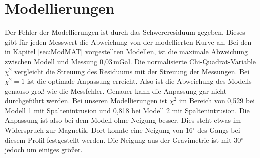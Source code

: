 \section{Modellierungen}

Der Fehler der Modellierungen ist durch das Schwereresiduum gegeben. Dieses gibt für jeden Messwert die Abweichung von der modellierten Kurve an. Bei den in Kapitel \ref{sec:ModMAT} vorgestellten Modellen, ist die maximale Abweichung zwischen Modell und Messung 0,03\,mGal. Die normalisierte Chi-Quadrat-Variable $\chi^2$ vergleicht die Streuung des Residuums mit der Streuung der Messungen. Bei $\chi^2=1$ ist die optimale Anpassung erreicht. Also ist die Abweichung des Modells genauso groß wie die Messfehler. Genauer kann die Anpassung gar nicht durchgeführt werden. Bei unseren Modellierungen ist $\chi^2$ im Bereich von 0,529 bei Modell 1 mit Spaltenintrusion und 0,818 bei Modell 2 mit Spaltenintrusion.  Die Anpassung ist also bei dem Modell ohne Neigung besser. Dies steht etwas im Widerspruch zur Magnetik. Dort konnte eine Neigung von 16$^\circ$ des Gangs bei diesem Profil festgestellt werden. Die Neigung aus der Gravimetrie ist mit 30$^\circ$ jedoch um einiges größer.
